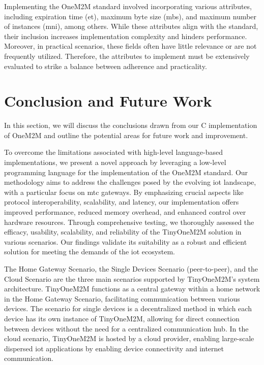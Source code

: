 \documentclass[a4paper,fleqn]{cas-dc}
\begin{document}
Implementing the OneM2M standard involved incorporating various attributes, including expiration time (et), maximum byte size (mbs), and maximum number of instances (mni), among others. While these attributes align with the standard, their inclusion increases implementation complexity and hinders performance. Moreover, in practical scenarios, these fields often have little relevance or are not frequently utilized. Therefore, the attributes to implement must be extensively evaluated to strike a balance between adherence and practicality.

\section{Conclusion and Future Work}
\label{conclusion}

In this section, we will discuss the conclusions drawn from our C implementation of OneM2M and outline the potential areas for future work and improvement.

To overcome the limitations associated with high-level language-based implementations, we present a novel approach by leveraging a low-level programming language for the implementation of the OneM2M standard. Our methodology aims to address the challenges posed by the evolving  \gls{iot} landscape, with a particular focus on  \gls{mtc} gateways. By emphasizing crucial aspects like protocol interoperability, scalability, and latency, our implementation offers improved performance, reduced memory overhead, and enhanced control over hardware resources. Through comprehensive testing, we thoroughly assessed the efficacy, usability, scalability, and reliability of the TinyOneM2M solution in various scenarios. Our findings validate its suitability as a robust and efficient solution for meeting the demands of the  \gls{iot} ecosystem.

The Home Gateway Scenario, the Single Devices Scenario (peer-to-peer), and the Cloud Scenario are the three main scenarios supported by TinyOneM2M's system architecture. TinyOneM2M functions as a central gateway within a home network in the Home Gateway Scenario, facilitating communication between various devices. The scenario for single devices is a decentralized method in which each device has its own instance of TinyOneM2M, allowing for direct connection between devices without the need for a centralized communication hub. In the cloud scenario, TinyOneM2M is hosted by a cloud provider, enabling large-scale dispersed  \gls{iot} applications by enabling device connectivity and internet communication. 
\end{document}
